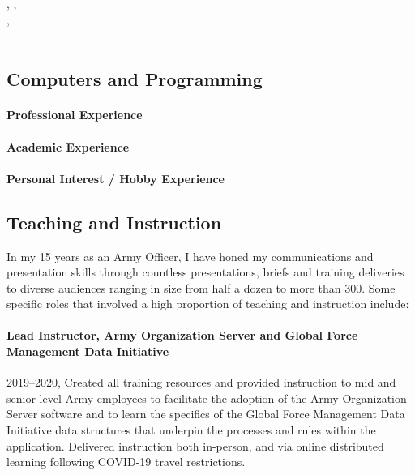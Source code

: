 \documentclass[12pt,letterpaper]{article}
\begin{document}
\paragraph{\DegreeCType} 
\DegreeCName \\
\DegreeCSchool , \DegreeCCity , \DegreeCState \\
\DegreeCHonors , \DegreeCDate \\
 \\
\DegreeCCourses

\subsection{Computers and Programming}
\paragraph{Professional Experience} \ComputerProfessionalExperience
\paragraph{Academic Experience} 
\ComputerAcademicExperience
\paragraph{Personal Interest / Hobby Experience} \ComputerHobbyExperience

\subsection{Teaching and Instruction}
In my 15 years as an Army Officer, I have honed my communications and presentation skills through countless presentations, briefs and training deliveries to diverse audiences ranging in size from half a dozen to more than 300. Some specific roles that involved a high proportion of teaching and instruction include:
\paragraph{Lead Instructor, Army Organization Server and Global Force Management Data Initiative} 2019--2020, Created all training resources and provided instruction to mid and senior level Army employees to facilitate the adoption of the Army Organization Server software and to learn the specifics of the Global Force Management Data Initiative data structures that underpin the processes and rules within the application. Delivered instruction both in-person, and via online distributed learning following COVID-19 travel restrictions.
\end{document}
